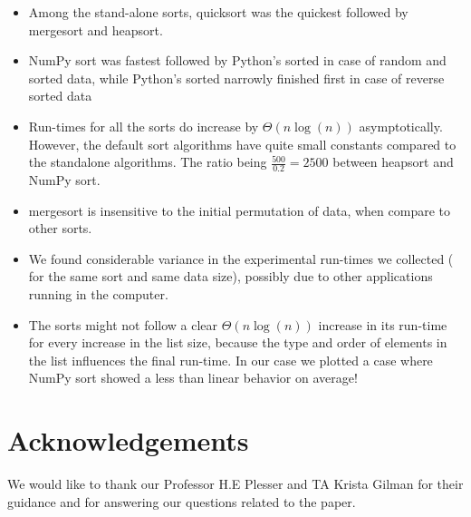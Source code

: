 \documentclass[sigconf, nonacm, natbib, screen, balance=False]{acmart}
\begin{document}
\begin{itemize}
\item Among the stand-alone sorts, quicksort was the quickest followed by mergesort and heapsort.
\item NumPy sort was fastest followed by Python's sorted in case of random and sorted data, while Python's sorted narrowly finished first in case of reverse sorted data
\item Run-times for all the sorts do increase by $\Theta \left(n\log\left(n\right)\right)$ asymptotically. However, the default sort algorithms have quite small constants compared to the standalone algorithms. The ratio being $\frac{500}{0.2} = 2500$ between heapsort and NumPy sort.
\item mergesort is insensitive to the initial permutation of data, when compare to other sorts.
\item We found considerable variance in the experimental run-times we collected ( for the same sort and same data size), possibly due to other applications running in the computer.
\item The sorts might not follow a clear $\Theta \left(n\log\left(n\right)\right)$ increase in its run-time for every increase in the list size, because the type and order of elements in the list influences the final run-time. In our case we plotted a case where NumPy sort showed a less than linear behavior on average!
\end{itemize}

\section{Acknowledgements}\label{sec:acknowledgements}
We would like to thank our Professor H.E Plesser and TA Krista Gilman for their guidance and for answering our questions related to the paper. 



\end{document}
